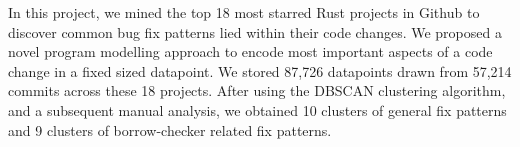 In this project, we mined the top 18 most starred Rust projects in Github to discover common bug fix patterns lied within their code changes. We proposed a novel program modelling approach to encode most important aspects of a code change in a fixed sized datapoint. We stored 87,726 datapoints drawn from 57,214 commits across these 18 projects. After using the DBSCAN clustering algorithm, and a subsequent manual analysis, we obtained 10 clusters of general fix patterns and 9 clusters of borrow-checker related fix patterns.